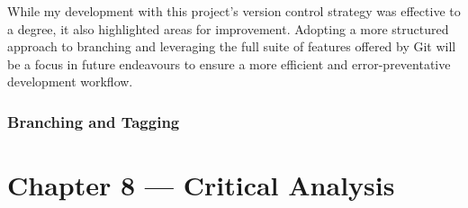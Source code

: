 \documentclass{article}
\begin{document}
While my development with this project's version control strategy was effective to a degree, it also highlighted areas for improvement. Adopting a more structured approach to branching and leveraging the full suite of features offered by Git will be a focus in future endeavours to ensure a more efficient and error-preventative development workflow.

\subsubsection{Branching and Tagging}

\section{Chapter 8 --- Critical Analysis}
\end{document}
